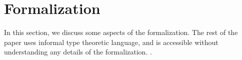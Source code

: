 \section{Formalization}
\label{sec:formalization}

In this section, we discuss some aspects of the formalization.
The rest of the paper uses informal type theoretic language, and is accessible without understanding any details of the formalization.
.